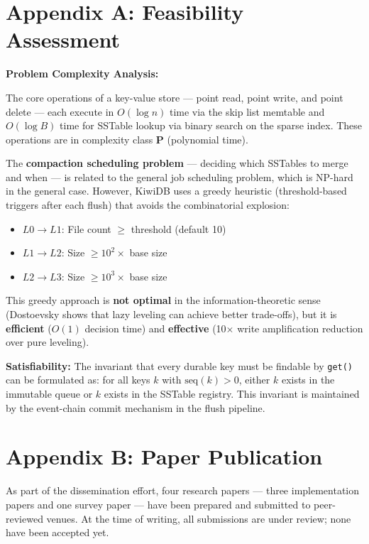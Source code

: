 \documentclass[oneside,a4paper,12pt]{book}
\begin{document}
\section{Appendix A: Feasibility Assessment}

\textbf{Problem Complexity Analysis:}

The core operations of a key-value store --- point read, point write, and point delete --- each execute in $O(\log n)$ time via the skip list memtable and $O(\log B)$ time for SSTable lookup via binary search on the sparse index. These operations are in complexity class \textbf{P} (polynomial time).

The \textbf{compaction scheduling problem} --- deciding which SSTables to merge and when --- is related to the general job scheduling problem, which is NP-hard in the general case. However, KiwiDB uses a greedy heuristic (threshold-based triggers after each flush) that avoids the combinatorial explosion:
\begin{itemize}[leftmargin=2em]
    \item $L0 \rightarrow L1$: File count $\geq$ threshold (default 10)
    \item $L1 \rightarrow L2$: Size $\geq 10^2 \times$ base size
    \item $L2 \rightarrow L3$: Size $\geq 10^3 \times$ base size
\end{itemize}

This greedy approach is \textbf{not optimal} in the information-theoretic sense (Dostoevsky \cite{c11} shows that lazy leveling can achieve better trade-offs), but it is \textbf{efficient} ($O(1)$ decision time) and \textbf{effective} (10$\times$ write amplification reduction over pure leveling).

\textbf{Satisfiability:} The invariant that every durable key must be findable by \texttt{get()} can be formulated as: for all keys $k$ with $\text{seq}(k) > 0$, either $k$ exists in the immutable queue or $k$ exists in the SSTable registry. This invariant is maintained by the event-chain commit mechanism in the flush pipeline.

\section{Appendix B: Paper Publication}

As part of the dissemination effort, four research papers --- three implementation papers and one survey paper --- have been prepared and submitted to peer-reviewed venues. At the time of writing, all submissions are under review; none have been accepted yet.
\end{document}
